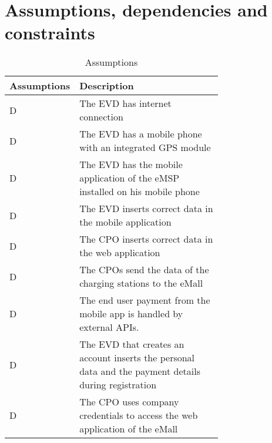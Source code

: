 \section{Assumptions, dependencies and constraints}
\label{sec:Assumptions, dependencies and constraints}%
\setcounter{ac}{1}
\newcommand{\acount}{\theac\stepcounter{ac}}
\begin{table}[h!]
    \centering
    \begin{tabular}{|l|p{0.725\linewidth}|}
     \hline
     \textbf{Assumptions} & \textbf{Description} \\
     \hline
     D\acount & The EVD has internet connection \\
     \hline
     D\acount & The EVD has a mobile phone with an integrated GPS module \\
     \hline
     D\acount & The EVD has the mobile application of the eMSP installed on his mobile phone \\
     \hline
     D\acount & The EVD inserts correct data in the mobile application \\
     \hline
     D\acount & The CPO inserts correct data in the web application \\
     \hline
     D\acount & The CPOs send the data of the charging stations to the eMall \\
     \hline
     D\acount & The end user payment from the mobile app is handled by external APIs.\\
     \hline
     D\acount & The EVD that creates an account inserts the personal data and the payment details during registration \\
     \hline
     D\acount & The CPO uses company credentials to access the web application of the eMall \\
     \hline
\end{tabular}
    \caption{Assumptions}
    \label{tab:Assumptions}
\end{table}
